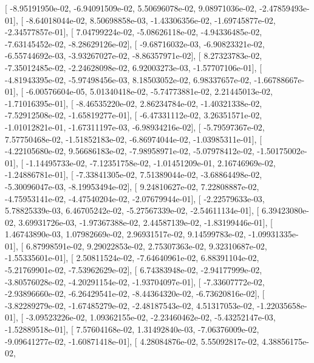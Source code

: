 \documentclass{article}
\begin{document}
       [ -8.95191950e-02,  -6.94091509e-02,   5.50696078e-02,
          9.08971036e-02,  -2.47859493e-01],
       [ -8.64018044e-02,   8.50698858e-03,  -1.43306356e-02,
         -1.69745877e-02,  -2.34577857e-01],
       [  7.04799224e-02,  -5.08626118e-02,  -4.94336485e-02,
         -7.63145452e-02,  -8.28629126e-02],
       [ -9.68716032e-03,  -6.90823321e-02,  -6.55744692e-03,
         -3.93267027e-02,  -8.86357971e-02],
       [  8.27323783e-02,  -7.35012485e-02,  -2.24628098e-02,
          6.92003273e-03,  -1.57707106e-01],
       [ -4.81943395e-02,  -5.97498456e-03,   8.18503052e-02,
          6.98337657e-02,  -1.66788667e-01],
       [ -6.00576604e-05,   5.01340418e-02,  -5.74773881e-02,
          2.21445013e-02,  -1.71016395e-01],
       [ -8.46535220e-02,   2.86234784e-02,  -1.40321338e-02,
         -7.52912508e-02,  -1.65819277e-01],
       [ -6.47331112e-02,   3.26351571e-02,  -1.01012821e-01,
         -1.67311197e-03,  -6.98934216e-02],
       [ -5.79597367e-02,   7.57750468e-02,  -1.51852183e-02,
         -6.86974044e-02,  -1.03985311e-01],
       [ -4.22105680e-02,   9.56686183e-02,  -7.98958971e-02,
         -5.07978412e-02,  -1.50175002e-01],
       [ -1.14495733e-02,  -7.12351758e-02,  -1.01451209e-01,
          2.16746969e-02,  -1.24886781e-01],
       [ -7.33841305e-02,   7.51389044e-02,  -3.68864498e-02,
         -5.30096047e-03,  -8.19953494e-02],
       [  9.24810627e-02,   7.22808887e-02,  -4.75953141e-02,
         -4.47540204e-02,  -2.07679944e-01],
       [ -2.22579633e-03,   5.78825339e-03,   6.46705242e-02,
         -5.27567339e-02,  -2.54611134e-01],
       [  6.39423080e-02,   3.69931726e-03,  -1.97367388e-02,
          2.44587139e-02,  -1.83199446e-01],
       [  1.46743890e-03,   1.07982669e-02,   2.96931517e-02,
          9.14599783e-02,  -1.09931335e-01],
       [  6.87998591e-02,   9.29022853e-02,   2.75307363e-02,
          9.32310687e-02,  -1.55335601e-01],
       [  2.50811524e-02,  -7.64640961e-02,   6.88391104e-02,
         -5.21769901e-02,  -7.53962629e-02],
       [  6.74383948e-02,  -2.94177999e-02,  -3.80576028e-02,
         -4.20291154e-02,  -1.93704097e-01],
       [ -7.33607772e-02,  -2.93896660e-02,  -6.26429541e-02,
         -8.44364320e-02,  -6.73620816e-02],
       [ -3.82289279e-02,  -1.67485279e-02,  -2.48187543e-02,
          4.51317053e-02,  -1.22035658e-01],
       [ -3.09523226e-02,   1.09362155e-02,  -2.23460462e-02,
         -5.43252147e-03,  -1.52889518e-01],
       [  7.57604168e-02,   1.31492840e-03,  -7.06376009e-02,
         -9.09641277e-02,  -1.60871418e-01],
       [  4.28084876e-02,   5.55092817e-02,   4.38856175e-02,
\end{document}
